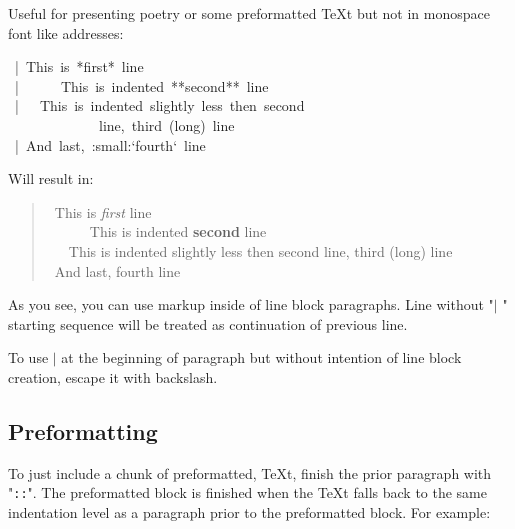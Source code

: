 \documentclass[12pt]{article}
\begin{document}
Useful for presenting poetry or some preformatted \TeX{}t but not in monospace
font like addresses:

\begin{ttfamily}\begin{flushleft}
\mbox{~|~This~is~*first*~line}\\
\mbox{~|~~~~~~This~is~indented~**second**~line}\\
\mbox{~|~~~This~is~indented~slightly~less~then~second}\\
\mbox{~~~~~~~~~~~~~line,~third~(long)~line}\\
\mbox{~|~And~last,~:small:`fourth`~line}\\
\end{flushleft}\end{ttfamily}

Will result in:

\begin{verse}
~This is \emph{first} line\\
~~~~~~This is indented \textbf{second} line\\
~~~This is indented slightly less then second
 line, third (long) line\\
~And last, {\small fourth} line
\end{verse}

As you see, you can use markup inside of line block paragraphs. Line without
"$|$ " starting sequence will be treated as continuation of previous line.

To use $|$ at the beginning of paragraph but without intention of line block
creation, escape it with backslash.

\begin{center}
\end{center}

\hypertarget{ldouble-colon}{}

\hypertarget{lpreformatting}{}
\subsection{Preformatting}

To just include a chunk of preformatted, \TeX{}t, finish the prior
paragraph with "\texttt{::}". The preformatted block is finished when the
\TeX{}t falls back to the same indentation level as a paragraph prior to
the preformatted block. For example:
\end{document}
